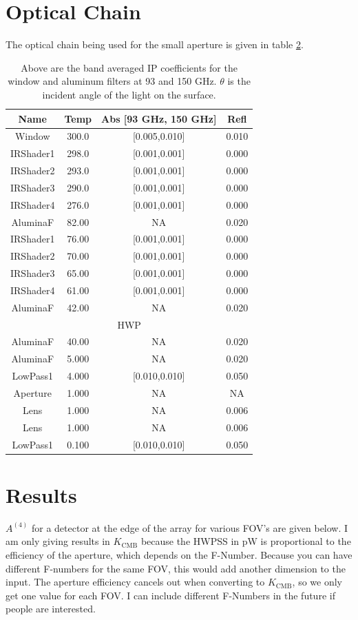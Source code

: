 \documentclass{article}
\theoremstyle{remark}
\newcommand{\A}[1]{A^{(#1)}}
\begin{document}
\section{Optical Chain}
The optical chain being used for the small aperture is given in table \ref{}.



\begin{table}
\centering
\begin{tabular}{|c|c|c|c|}
\hline
Name & Temp & Abs [93 GHz, 150 GHz] & Refl \\
\hline
Window		& 300.0  & [0.005,0.010]	&0.010 \\
IRShader1	& 298.0  & [0.001,0.001]	&0.000 \\
IRShader2	& 293.0  & [0.001,0.001]	&0.000 \\
IRShader3	& 290.0  & [0.001,0.001]	&0.000 \\
IRShader4	& 276.0  & [0.001,0.001]	&0.000 \\
AluminaF	& 82.00  &  NA			   	&0.020 \\
IRShader1	& 76.00  & [0.001,0.001]	&0.000 \\
IRShader2	& 70.00  & [0.001,0.001]	&0.000 \\
IRShader3	& 65.00  & [0.001,0.001]	&0.000 \\
IRShader4	& 61.00  & [0.001,0.001]	&0.000 \\
AluminaF	& 42.00  &  NA			   	&0.020 \\
\hline
\multicolumn{4}{|c|}{HWP} \\
\hline
AluminaF	& 40.00  &  NA			   	&0.020 \\
AluminaF	& 5.000  &  NA			   	&0.020 \\
LowPass1	& 4.000  & [0.010,0.010]	&0.050 \\
Aperture	& 1.000  & NA	       		&NA	   \\
Lens		& 1.000  &  NA			   	&0.006 \\
Lens		& 1.000  &  NA			   	&0.006 \\
LowPass1	& 0.100  & [0.010,0.010]	&0.050 \\

\hline
\end{tabular}
\caption{ Above are the band averaged IP coefficients for the window and aluminum filters at 93 and 150 GHz. $\theta$ is the incident angle of the light
on the surface.
}
\label{table:small_aperture_optical_chain}
\end{table}



\section{Results}
$\A4$ for a detector at the edge of the array for various FOV's are given below.
I am only giving results in $K_\text{CMB}$ because the HWPSS in pW is proportional to the efficiency of the aperture,
which depends on the F-Number.
Because you can have different F-numbers for the same FOV, this would add another dimension to the input.
The aperture efficiency cancels out when converting to $K_\text{CMB}$, so we only get one value for each FOV.
I can include different F-Numbers in the future if people are interested.
\end{document}
